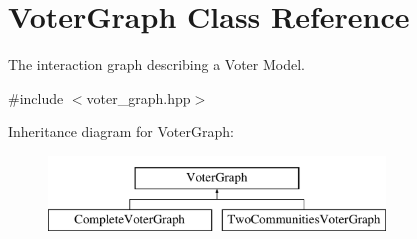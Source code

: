 \hypertarget{class_voter_graph}{}\section{Voter\+Graph Class Reference}
\label{class_voter_graph}


The interaction graph describing a Voter Model.  




{\ttfamily \#include $<$voter\+\_\+graph.\+hpp$>$}

Inheritance diagram for Voter\+Graph\+:\begin{figure}[H]
\begin{center}
\leavevmode
\includegraphics[height=2.000000cm]{class_voter_graph}
\end{center}
\end{figure}
